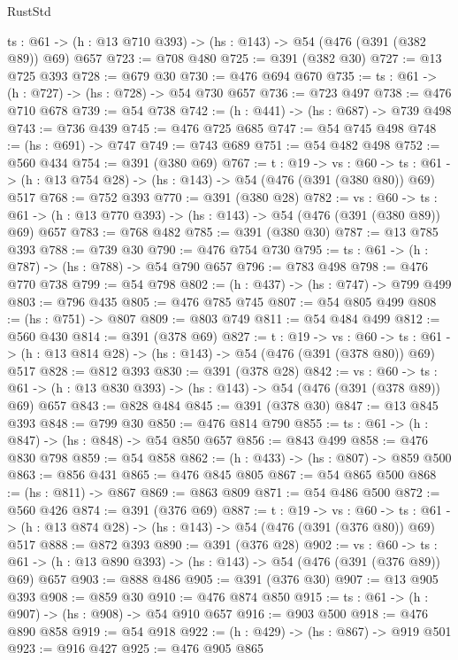 \begin{lexlean}{RustStd}
\begin{coremodule}
  {ts : @61} -> (h : @13 @710 @393) -> (hs : @143) -> @54 (@476 (@391 (@382 @89)) @69) @657
@723 := @708 @480
@725 := @391 (@382 @30)
@727 := @13 @725 @393
@728 := @679 @30
@730 := @476 @694 @670
@735 := {ts : @61} -> (h : @727) -> (hs : @728) -> @54 @730 @657
@736 := @723 @497
@738 := @476 @710 @678
@739 := @54 @738
@742 := (h : @441) -> (hs : @687) -> @739 @498
@743 := @736 @439
@745 := @476 @725 @685
@747 := @54 @745 @498
@748 := (hs : @691) -> @747
@749 := @743 @689
@751 := @54 @482 @498
@752 := @560 @434
@754 := @391 (@380 @69)
@767 := {t : @19} ->
  {vs : @60} ->
  {ts : @61} -> (h : @13 @754 @28) -> (hs : @143) -> @54 (@476 (@391 (@380 @80)) @69) @517
@768 := @752 @393
@770 := @391 (@380 @28)
@782 := {vs : @60} ->
  {ts : @61} -> (h : @13 @770 @393) -> (hs : @143) -> @54 (@476 (@391 (@380 @89)) @69) @657
@783 := @768 @482
@785 := @391 (@380 @30)
@787 := @13 @785 @393
@788 := @739 @30
@790 := @476 @754 @730
@795 := {ts : @61} -> (h : @787) -> (hs : @788) -> @54 @790 @657
@796 := @783 @498
@798 := @476 @770 @738
@799 := @54 @798
@802 := (h : @437) -> (hs : @747) -> @799 @499
@803 := @796 @435
@805 := @476 @785 @745
@807 := @54 @805 @499
@808 := (hs : @751) -> @807
@809 := @803 @749
@811 := @54 @484 @499
@812 := @560 @430
@814 := @391 (@378 @69)
@827 := {t : @19} ->
  {vs : @60} ->
  {ts : @61} -> (h : @13 @814 @28) -> (hs : @143) -> @54 (@476 (@391 (@378 @80)) @69) @517
@828 := @812 @393
@830 := @391 (@378 @28)
@842 := {vs : @60} ->
  {ts : @61} -> (h : @13 @830 @393) -> (hs : @143) -> @54 (@476 (@391 (@378 @89)) @69) @657
@843 := @828 @484
@845 := @391 (@378 @30)
@847 := @13 @845 @393
@848 := @799 @30
@850 := @476 @814 @790
@855 := {ts : @61} -> (h : @847) -> (hs : @848) -> @54 @850 @657
@856 := @843 @499
@858 := @476 @830 @798
@859 := @54 @858
@862 := (h : @433) -> (hs : @807) -> @859 @500
@863 := @856 @431
@865 := @476 @845 @805
@867 := @54 @865 @500
@868 := (hs : @811) -> @867
@869 := @863 @809
@871 := @54 @486 @500
@872 := @560 @426
@874 := @391 (@376 @69)
@887 := {t : @19} ->
  {vs : @60} ->
  {ts : @61} -> (h : @13 @874 @28) -> (hs : @143) -> @54 (@476 (@391 (@376 @80)) @69) @517
@888 := @872 @393
@890 := @391 (@376 @28)
@902 := {vs : @60} ->
  {ts : @61} -> (h : @13 @890 @393) -> (hs : @143) -> @54 (@476 (@391 (@376 @89)) @69) @657
@903 := @888 @486
@905 := @391 (@376 @30)
@907 := @13 @905 @393
@908 := @859 @30
@910 := @476 @874 @850
@915 := {ts : @61} -> (h : @907) -> (hs : @908) -> @54 @910 @657
@916 := @903 @500
@918 := @476 @890 @858
@919 := @54 @918
@922 := (h : @429) -> (hs : @867) -> @919 @501
@923 := @916 @427
@925 := @476 @905 @865

\end{coremodule}
\end{lexlean}
